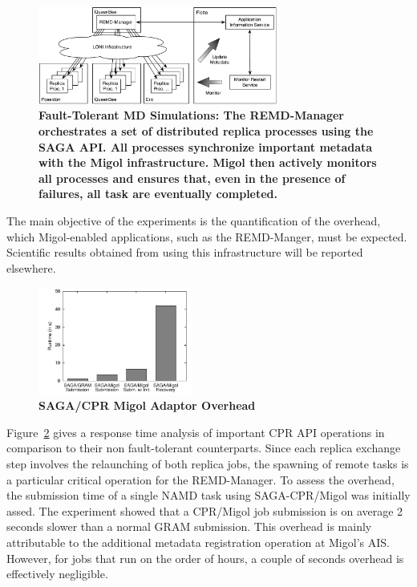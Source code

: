 \documentclass[times, 10pt, twocolumn]{article}
\newcommand{\jhanote}[1]{ {\textcolor{red} { ***SJ: #1 }}}
\newcommand{\jhanote}[1]{}
\newcommand{\up}{\vspace*{-1em}}
\begin{document}
\begin{figure}[t]
    \centering
        \includegraphics[width=0.7\textwidth]{saga-taskfarming}
        \caption{\small \bf Fault-Tolerant MD Simulations: The
          REMD-Manager orchestrates a set of distributed replica
          processes using the SAGA API. All processes synchronize
          important metadata with the Migol infrastructure. Migol then
          actively monitors all processes and ensures that, even in
          the presence of failures, all task are eventually
          completed.\up\up}
    \label{fig:saga-taskfarming}
\end{figure} 
The main objective of the experiments is the quantification of the overhead, 
which Migol-enabled applications, such as the REMD-Manger, must be expected.
Scientific results obtained from using this infrastructure will be 
reported elsewhere.
\begin{figure}[ht]
    \centering
        \includegraphics[width=0.45\textwidth]{performance/perf_submission.pdf}
    \up
    \caption{\small \bf SAGA/CPR Migol Adaptor Overhead}
    
    \label{fig:performance_perf_submission}
\end{figure}           
Figure~\ref{fig:performance_perf_submission} gives a response time
analysis of important CPR API operations in comparison to their non
fault-tolerant counterparts. Since each replica exchange step involves
the relaunching of both replica jobs, the spawning of remote tasks is
a particular critical operation for the REMD-Manager.
To assess the overhead, the submission time of a single NAMD task
using SAGA-CPR/Migol was initially assed. The experiment showed that a
CPR/Migol job submission is on average 2\,seconds slower than a normal
GRAM submission. This overhead is mainly attributable to the
additional metadata registration operation at Migol's AIS. However,
for jobs that run on the order of hours, a couple of seconds overhead
is effectively negligible.
\end{document}
